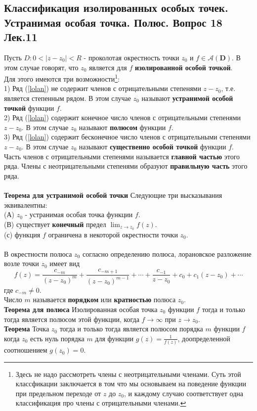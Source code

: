 \documentclass{article}
\begin{document}
\subsection{Классификация изолированных особых точек. Устранимая особая точка. Полюс. Вопрос 18 Лек.11}
	Пусть $ D: 0<\left|z-z_{0}\right|<R $ - проколотая окрестность точки $ z_{0} $ и $ f \in \mathcal{A}(\mathbf{D}) $. В этом случае говорят, что $ z_{0} $ является для $ f $ \textbf{изолированной особой точкой}.\\
	Для этого имеются три возможности\footnote{Здесь не надо рассмотреть члены с неотрицательными членами. Суть этой классфикации заключается в том что мы основываем на поведение функции при предельном переходе от $z$ до ${z}_{0}$, и каждому случаю соответствует одна классификация про члены с отрицательными членами.}:\\
	1) Ряд (\ref{lolan}) не содержит членов с отрицательными степенями $z-{z}_{0}$, т.е. является степенным рядом. В этом случае ${z}_{0}$ называют \textbf{устранимой особой точкой} функции $ f$.\\
	2) Ряд (\ref{lolan}) содержит конечное число членов с отрицательными степенями $z-z_{0}$. В этом случае ${z}_{0}$ называют \textbf{полюсом} функции $ f$.\\
	3) Ряд (\ref{lolan}) содержит бесконечное число членов с отрицательными степенями $ z-z_{0} $. В этом случае ${z}_{0}$ называют \textbf{существенно особой точкой} функции $ f$.\\
	Часть членов с отрицательными степенями называется \textbf{главной частью} этого ряда. Члены с неотрицательными степенями образуют	\textbf{правильную часть} этого ряда.\\
	\\
	\textbf{Теорема для устранимой особой точки} Следующие три высказывания эквивалентны:\\
	(А) $z_{0}$ - устранимая особая точка функции $f$.\\ 
	(В) существует \textbf{конечный} предел $ \lim _{z \rightarrow z_{0}} f(z)$.\\ 
	(с) функция $ f $ ограничена в некоторой окрестности точки $ z_{0}$.\\ 
	\\
	В окрестности полюса $z_{0}$ согласно определению полюса, лорановское разложение возле точки $z_{0}$ имеет вид
	\begin{equation}
	f(z)=\frac{c_{-m}}{\left(z-z_{0}\right)^{m}}+\frac{c_{-m+1}}{\left(z-z_{0}\right)^{m-1}}+\cdots+\frac{c_{-1}}{z-z_{0}}+c_{0}+c_{1}\left(z-z_{0}\right)+\cdots
	\end{equation}
	где $ c_{-m} \neq 0$.\\ 
	Число $ m $ называется \textbf{порядком} или \textbf{кратностью} полюса $ z_{0}$.\\
	\textbf{Теорема для полюса} Изолированная особая точка $ z_{0}$ функции $ f $ тогда и только тогда является полюсом этой функции, когда $ f \rightarrow \infty $ при $ z \rightarrow z_{0}$.\\
	\textbf{Теорема} Точка $ z_{0}$ тогда и только тогда является полюсом порядка $ m $ функции $ f $ когда $ z_{0}$ есть нуль порядка $ m $ для функции $ g(z)=\frac{1}{f(z)}$, доопределенной соотношением $ g\left(z_{0}\right)=0$.\\ 
\end{document}
